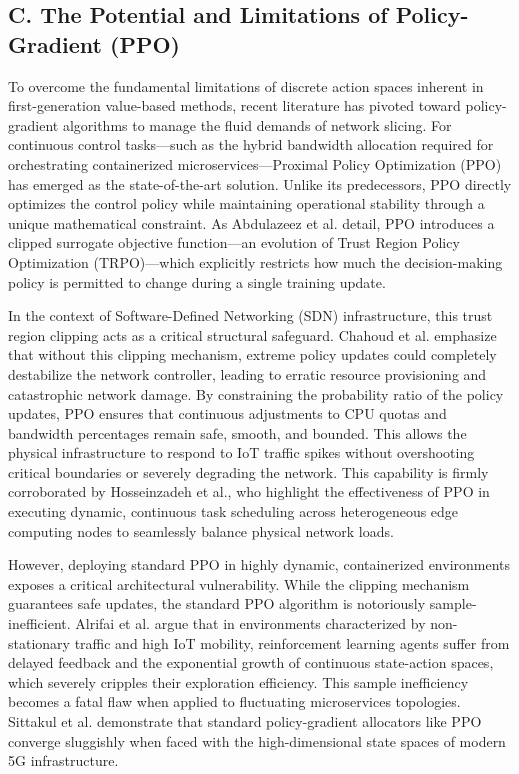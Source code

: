 \subsection{C. The Potential and Limitations of Policy-Gradient (PPO)}\label{c.-the-potential-and-limitations-of-policy-gradient-ppo}

To overcome the fundamental limitations of discrete action spaces inherent in first-generation value-based methods, recent literature has pivoted toward policy-gradient algorithms to manage the fluid demands of network slicing. For continuous control tasks---such as the hybrid bandwidth allocation required for orchestrating containerized microservices---Proximal Policy Optimization (PPO) has emerged as the state-of-the-art solution. Unlike its predecessors, PPO directly optimizes the control policy while maintaining operational stability through a unique mathematical constraint. As Abdulazeez et al. detail, PPO introduces a clipped surrogate objective function---an evolution of Trust Region Policy Optimization (TRPO)---which explicitly restricts how much the decision-making policy is permitted to change during a single training update\cite{b40}.

In the context of Software-Defined Networking (SDN) infrastructure, this trust region clipping acts as a critical structural safeguard. Chahoud et al. emphasize that without this clipping mechanism, extreme policy updates could completely destabilize the network controller, leading to erratic resource provisioning and catastrophic network damage\cite{b18}. By constraining the probability ratio of the policy updates, PPO ensures that continuous adjustments to CPU quotas and bandwidth percentages remain safe, smooth, and bounded. This allows the physical infrastructure to respond to IoT traffic spikes without overshooting critical boundaries or severely degrading the network\cite{b18}. This capability is firmly corroborated by Hosseinzadeh et al., who highlight the effectiveness of PPO in executing dynamic, continuous task scheduling across heterogeneous edge computing nodes to seamlessly balance physical network loads\cite{b15}.

However, deploying standard PPO in highly dynamic, containerized environments exposes a critical architectural vulnerability. While the clipping mechanism guarantees safe updates, the standard PPO algorithm is notoriously sample-inefficient\cite{b18}. Alrifai et al. argue that in environments characterized by non-stationary traffic and high IoT mobility, reinforcement learning agents suffer from delayed feedback and the exponential growth of continuous state-action spaces, which severely cripples their exploration efficiency\cite{b14}. This sample inefficiency becomes a fatal flaw when applied to fluctuating microservices topologies. Sittakul et al. demonstrate that standard policy-gradient allocators like PPO converge sluggishly when faced with the high-dimensional state spaces of modern 5G infrastructure\cite{b16}.


